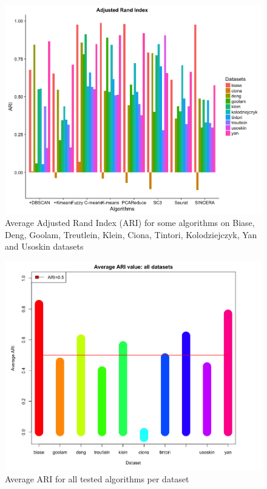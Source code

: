 \documentclass{report}
\begin{document}
{\begin{figure}[H]
\centering
\includegraphics[scale=0.4]{benchmark/ariAll.png}
\caption{Average Adjusted Rand Index (ARI) for some algorithms on Biase, Deng, Goolam, Treutlein, Klein, Ciona, Tintori, Kolodziejczyk, Yan and Usoskin datasets}
\label{averageARI}
\end{figure}

\begin{figure}[H]
\centering
\includegraphics[scale=0.35]{benchmark/ariAverageAllDatasets.png}
\caption{Average ARI for all tested algorithms per dataset}
\label{ariDataset}
\end{figure}

}
\end{document}
